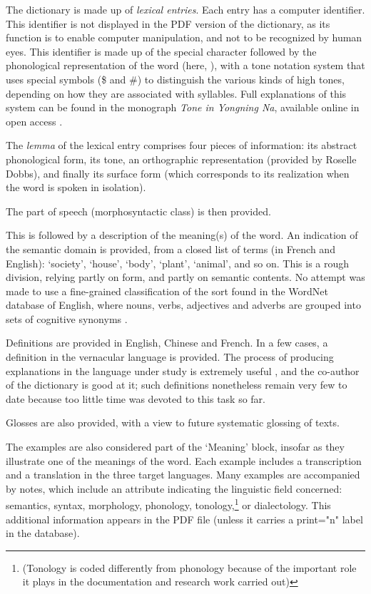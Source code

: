 The dictionary is made up of \emph{lexical entries}. Each entry has a computer identifier. This identifier is not displayed in the PDF version of the dictionary, as its function is to enable computer manipulation, and not to be recognized by human eyes. This identifier is made up of the special character  followed by the phonological representation of the word (here, ), with a tone notation system that uses special symbols (\$ and \#) to distinguish the various kinds of high tones, depending on how they are associated with syllables. Full explanations of this system can be found in the monograph \emph{Tone in Yongning Na}, available online in open access \parencite[80-90]{michaud2017}.

The \emph{lemma} of the lexical entry comprises four pieces of information: its abstract phonological form, its tone, an orthographic representation (provided by Roselle Dobbs), and finally its surface form (which corresponds to its realization when the word is spoken in isolation).

The part of speech (morphosyntactic class) is then provided.

This is followed by a description of the meaning(s) of the word. An indication of the semantic domain is provided, from a closed list of terms (in French and English): ‘society’, ‘house’, ‘body’, ‘plant’, ‘animal’, and so on. This is a rough division, relying partly on form, and partly on semantic contents. No attempt was made to use a fine-grained classification of the sort found in the WordNet database of English, where nouns, verbs, adjectives and adverbs are grouped into sets of cognitive synonyms \parencite{fellbaum2005}.

Definitions are provided in English, Chinese and French. In a few cases, a definition in the vernacular language is provided. The process of producing explanations in the language under study is extremely useful \parencite{dingemanse_folk_2015}, and the co-author of the dictionary is good at it; such definitions nonetheless remain very few to date because too little time was devoted to this task so far.

Glosses are also provided, with a view to future systematic glossing of texts.

The examples are also considered part of the ‘Meaning’ block, insofar as they illustrate one of the meanings of the word. Each example includes a transcription and a translation in the three target languages. Many examples are accompanied by notes, which include an attribute indicating the linguistic field concerned: semantics, syntax, morphology, phonology, tonology,\footnote{(Tonology is coded differently from phonology because of the important role it plays in the documentation and research work carried out)} or dialectology. This additional information appears in the PDF file (unless it carries a print="n" label in the database).

